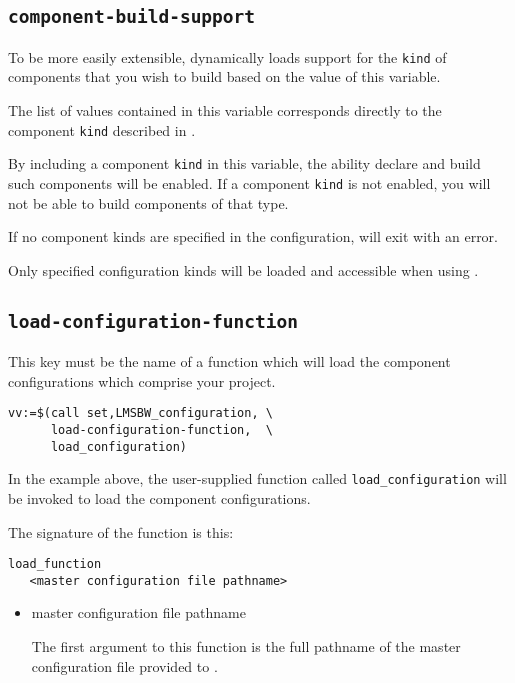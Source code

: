 \subsection{\texttt{component-build-support}}\label{variables:component-build-support}

To be more easily extensible, \lmsbw dynamically loads support for the
\texttt{kind} of components that you wish to build based on the value
of this variable.

The list of values contained in this variable corresponds directly to
the component \texttt{kind} described in .

By including a component \texttt{kind} in this variable, the ability
declare and build such components will be enabled.  If a component
\texttt{kind} is not enabled, you will not be able to build components
of that type.

If no component kinds are specified in the configuration, \lmsbw will
exit with an error.

Only specified configuration kinds will be loaded and accessible when
using \lmsbw.

\subsection{\texttt{load-configuration-function}}\label{variables:load-configuration-function}

This key must be the name of a \gnumake function which will load the
component configurations which comprise your project.

\begin{verbatim}
vv:=$(call set,LMSBW_configuration, \
      load-configuration-function,  \
      load_configuration)
\end{verbatim}

In the example above, the user-supplied function called
\texttt{load\_configuration} will be invoked to load the component
configurations.

The signature of the function is this:

\begin{verbatim}
load_function
   <master configuration file pathname>
\end{verbatim}

\begin{itemize}
\item master configuration file pathname

  The first argument to this function is the full pathname of the
  master configuration file provided to \lmsbw. 
\end{itemize}

